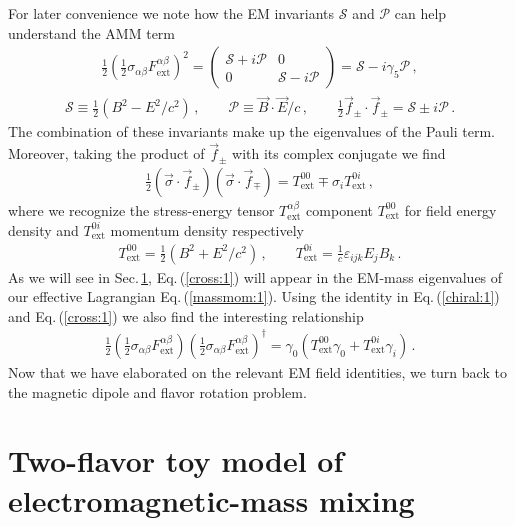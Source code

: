 \documentclass{ws-ijmpa}
\newcommand{\req}[1]{Eq.\,(\ref{#1})}
\newcommand{\rsec}[1]{Sec.\,{\ref{#1}}}
\begin{document}
For later convenience we note how the EM invariants $\mathcal{S}$ and $\mathcal{P}$ can help understand the AMM term 
\begin{align}
\label{invar:1}
\frac{1}{2}\left(\frac{1}{2}\sigma_{\alpha\beta}F^{\alpha\beta}_\mathrm{ext}\right)^{2}=
\begin{pmatrix}
\mathcal{S}+i\mathcal{P} & 0\\
0 & \mathcal{S}-i\mathcal{P}
\end{pmatrix}=\mathcal{S}-i\gamma_{5}\mathcal{P}\,,
\end{align}
%
\begin{align}
\mathcal{S}\equiv\frac{1}{2}\left(B^{2}-E^{2}/c^{2}\right)\,,\qquad
\mathcal{P}\equiv\vec{B}\cdot\vec{E}/c\,,\qquad
\frac{1}{2}\vec{f}_{\pm}\cdot\vec{f}_{\pm}=\mathcal{S}\pm i\mathcal{P}\,.
\end{align}
The combination of these invariants make up the eigenvalues of the Pauli term. Moreover, taking the product of $\vec{f}_{\pm}$ with its complex conjugate we find
\begin{align}
\label{cross:1}
\frac{1}{2}\left(\vec{\sigma}\cdot\vec{f}_{\pm}\right)\left(\vec{\sigma}\cdot\vec{f}_{\mp}\right)=T_\mathrm{ext}^{00}\mp \sigma_{i}T_\mathrm{ext}^{0i}\,,
\end{align}
where we recognize the stress-energy tensor $T_\mathrm{ext}^{\alpha\beta}$ component $T_\mathrm{ext}^{00}$ for field energy density and $T_\mathrm{ext}^{0i}$ momentum density respectively
\begin{align}
T_\mathrm{ext}^{00}=\frac{1}{2}\left(B^{2}+E^{2}/c^{2}\right)\,,\qquad
T_\mathrm{ext}^{0i}=\frac{1}{c}\varepsilon_{ijk}E_{j}B_{k}\,.
\end{align}
As we will see in \rsec{sec:nutoy}, \req{cross:1} will appear in the EM-mass eigenvalues of our effective Lagrangian \req{massmom:1}. Using the identity in \req{chiral:1} and \req{cross:1} we also find the interesting relationship
\begin{align}
\label{cross:2}
\frac{1}{2}\left(\frac{1}{2}\sigma_{\alpha\beta}F^{\alpha\beta}_\mathrm{ext}\right)\left(\frac{1}{2}\sigma_{\alpha\beta}F^{\alpha\beta}_\mathrm{ext}\right)^{\dag}=
\gamma_{0}\left(T_\mathrm{ext}^{00}\gamma_{0}+T_\mathrm{ext}^{0i}\gamma_{i}\right)\,.
\end{align}
Now that we have elaborated on the relevant EM field identities, we turn back to the magnetic dipole and flavor rotation problem.

\section{Two-flavor toy model of electromagnetic-mass mixing}
\label{sec:nutoy}
\end{document}
